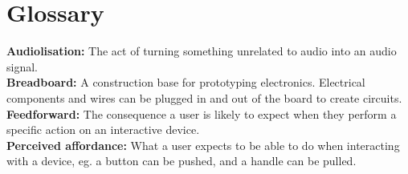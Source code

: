 \chapter*{Glossary}\label{ch:glossary}

\textbf{Audiolisation:} The act of turning something unrelated to audio into an audio signal.\\
\textbf{Breadboard:} A construction base for prototyping electronics. Electrical components and wires can be plugged in and out of the board to create circuits.\\
\textbf{Feedforward:} The consequence a user is likely to expect when they perform a specific action on an interactive device.\\
\textbf{Perceived affordance:} What a user expects to be able to do when interacting with a device, eg. a button can be pushed, and a handle can be pulled.